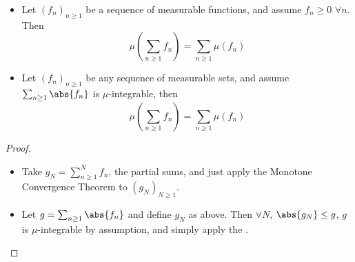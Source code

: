 \documentclass{article}
\newcommand{\1}[1]{\mathbbm{1}_{#1}}
\begin{document}
\begin{cor}
    \leavevmode
    \begin{itemize}
        \item Let $(f_n)_{n \geq 1}$ be a sequence of measurable functions, and assume $f_n \geq 0$ $\forall n$. Then
            \begin{equation*}
                \mu(\sum_{n \geq 1} f_n) = \sum_{n \geq 1} \mu(f_n)
            \end{equation*}

        \item Let $(f_n)_{n \geq 1}$ be any sequence of measurable sets, and assume $\sum_{n \geq 1} \abs{f_n}$ is $\mu$-integrable, then
            \begin{equation*}
                \mu\left(\sum_{n \geq 1} f_n\right) = \sum_{n \geq 1} \mu(f_n)
            \end{equation*}
    \end{itemize}
\end{cor}

\begin{proof}
    \leavevmode
    \begin{itemize}
        \item Take $g_N = \sum_{n \geq 1}^N f_n$, the partial sums, and just apply the Monotone Convergence Theorem to $(g_N)_{N \geq 1}$.
        \item Let $g = \sum_{n \geq 1} \abs{f_n}$ and define $g_N$ as above. Then $\forall N$, $\abs{g_N} \leq g$, $g$ is $\mu$-integrable by assumption, and simply apply the .
    \end{itemize}
\end{proof}
\end{document}
